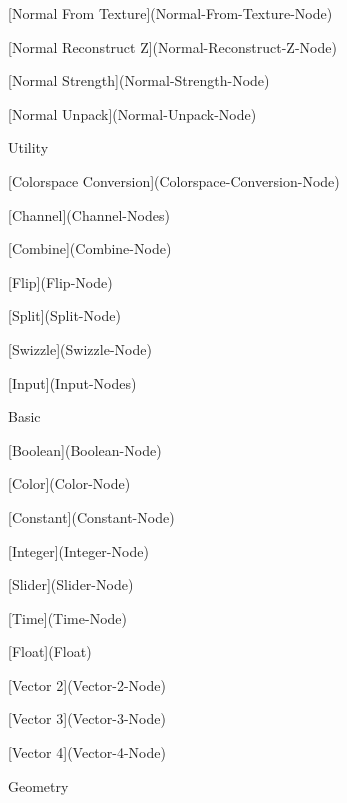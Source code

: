\begin{DoxyItemize}
\begin{DoxyItemize}
\begin{DoxyItemize}
\begin{DoxyItemize}
\item \mbox{[}Normal From Texture\mbox{]}(Normal-\/\+From-\/\+Texture-\/\+Node)
\item \mbox{[}Normal Reconstruct Z\mbox{]}(Normal-\/\+Reconstruct-\/\+Z-\/\+Node)
\item \mbox{[}Normal Strength\mbox{]}(Normal-\/\+Strength-\/\+Node)
\item \mbox{[}Normal Unpack\mbox{]}(Normal-\/\+Unpack-\/\+Node)
\end{DoxyItemize}
\item Utility
\begin{DoxyItemize}
\item \mbox{[}Colorspace Conversion\mbox{]}(Colorspace-\/\+Conversion-\/\+Node)
\end{DoxyItemize}
\end{DoxyItemize}
\item \mbox{[}Channel\mbox{]}(Channel-\/\+Nodes)
\begin{DoxyItemize}
\item \mbox{[}Combine\mbox{]}(Combine-\/\+Node)
\item \mbox{[}Flip\mbox{]}(Flip-\/\+Node)
\item \mbox{[}Split\mbox{]}(Split-\/\+Node)
\item \mbox{[}Swizzle\mbox{]}(Swizzle-\/\+Node)
\end{DoxyItemize}
\item \mbox{[}Input\mbox{]}(Input-\/\+Nodes)
\begin{DoxyItemize}
\item Basic
\begin{DoxyItemize}
\item \mbox{[}Boolean\mbox{]}(Boolean-\/\+Node)
\item \mbox{[}Color\mbox{]}(Color-\/\+Node)
\item \mbox{[}Constant\mbox{]}(Constant-\/\+Node)
\item \mbox{[}Integer\mbox{]}(Integer-\/\+Node)
\item \mbox{[}Slider\mbox{]}(Slider-\/\+Node)
\item \mbox{[}Time\mbox{]}(Time-\/\+Node)
\item \mbox{[}Float\mbox{]}(Float)
\item \mbox{[}Vector 2\mbox{]}(Vector-\/2-\/\+Node)
\item \mbox{[}Vector 3\mbox{]}(Vector-\/3-\/\+Node)
\item \mbox{[}Vector 4\mbox{]}(Vector-\/4-\/\+Node)
\end{DoxyItemize}
\item Geometry

\end{DoxyItemize}
\end{DoxyItemize}
\end{DoxyItemize}
